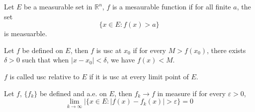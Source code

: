 \documentclass[openany]{book}
\newcommand{\R}{\mathbb{R}}
\begin{document}
\begin{defn}
    Let $E$ be a measurable set in $\R^n$, $f$ is a mesaurable function if for all finite $a$, the set 
    \begin{equation*}
        \{x\in E: f(x)>a\}
    \end{equation*}
    is measuarble. 
\end{defn}
\begin{defn}
    Let $f$ be defined on $E$, then $f$ is usc at $x_0$ if for every $M>f(x_0)$, there exists $\delta>0$ such that when $|x-x_0|<\delta$, we have $f(x)<M$.

    $f$ is called usc relative to $E$ if it is usc at every limit point of $E$.
\end{defn}
\begin{defn}
    Let $f$, $\{f_k\}$ be defined and a.e. on $E$, then $f_k\to f$ in measure if for every $\varepsilon>0$, 
    \begin{equation*}
        \lim_{k\to\infty}|\{x\in E: |f(x)-f_k(x)|>\varepsilon\}=0
    \end{equation*}
\end{defn}
\end{document}
